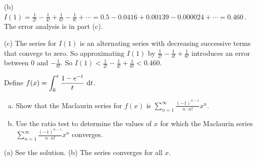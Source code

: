\begin{solution}
\noindent (b)
$I(1)=\frac{1}{2!}-\frac{1}{4!}+\frac{1}{6!}-\frac{1}{8!}+\cdots
=0.5-0.041\dot6+0.00139-0.000024+\cdots=\boxed{0.460}\,$.
The error analysis is in part (c).

\noindent (c) The series for $I(1)$ is an alternating series with decreasing
successive terms that convege to zero. So approximating
$I(1)$ by $\frac{1}{2!}-\frac{1}{4!}+\frac{1}{6!}$ introduces an error
between $0$ and $-\frac{1}{8!}$. So  $I(1)<\frac{1}{2!}-\frac{1}{4!}+\frac{1}{6!}<0.460$.

\end{solution}

\begin{question}[2016A]
Define
$
{\displaystyle f(x) = \int_0^x\frac{1-e^{-t}}{t}\ \mathrm{d}t}
$.
\begin{enumerate}[(a)]
\item
Show that the Maclaurin series for $f(x)$ is
$\displaystyle\sum_{n=1}^\infty \frac{(-1)^{n-1}}{n\cdot n!} x^n$.

\item
Use the ratio test to determine the values of $x$ for which
the Maclaurin series
$\displaystyle\sum_{n=1}^\infty \frac{(-1)^{n-1}}{n\cdot n!} x^n$ converges.
\end{enumerate}
\end{question}


\begin{answer}
(a) See the solution.
\qquad
(b) The series converges for all $x$.
\end{answer}

